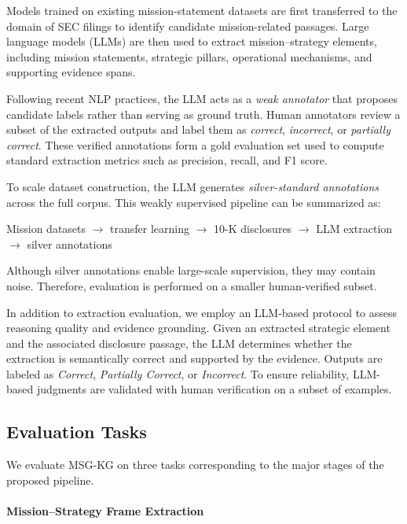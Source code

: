 \documentclass[11pt]{article}
\begin{document}
Models trained on existing mission-statement datasets are first transferred to the domain of SEC filings to identify candidate mission-related passages. Large language models (LLMs) are then used to extract mission--strategy elements, including mission statements, strategic pillars, operational mechanisms, and supporting evidence spans.

Following recent NLP practices, the LLM acts as a \textit{weak annotator} that proposes candidate labels rather than serving as ground truth. Human annotators review a subset of the extracted outputs and label them as \textit{correct}, \textit{incorrect}, or \textit{partially correct}. These verified annotations form a gold evaluation set used to compute standard extraction metrics such as precision, recall, and F1 score.

To scale dataset construction, the LLM generates \textit{silver-standard annotations} across the full corpus. This weakly supervised pipeline can be summarized as:

\begin{center}
Mission datasets $\rightarrow$ transfer learning $\rightarrow$ 10-K disclosures $\rightarrow$ LLM extraction $\rightarrow$ silver annotations
\end{center}

Although silver annotations enable large-scale supervision, they may contain noise. Therefore, evaluation is performed on a smaller human-verified subset.

In addition to extraction evaluation, we employ an LLM-based protocol to assess reasoning quality and evidence grounding. Given an extracted strategic element and the associated disclosure passage, the LLM determines whether the extraction is semantically correct and supported by the evidence. Outputs are labeled as \textit{Correct}, \textit{Partially Correct}, or \textit{Incorrect}. To ensure reliability, LLM-based judgments are validated with human verification on a subset of examples.

\subsection{Evaluation Tasks}

We evaluate MSG-KG on three tasks corresponding to the major stages of the proposed pipeline.

\paragraph{Mission--Strategy Frame Extraction}
\end{document}
